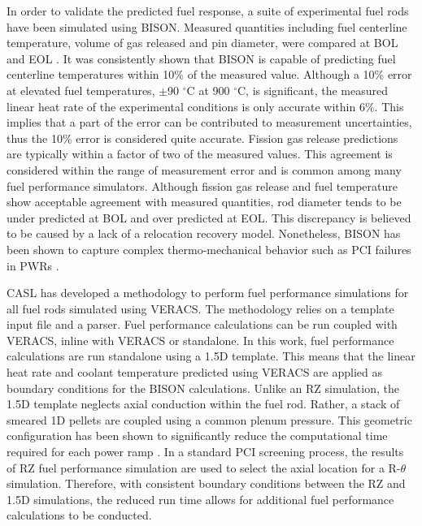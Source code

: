 \documentclass[edeposit,fullpage,11pt]{uiucthesis2009}
\begin{document}
In order to validate the predicted fuel response, a suite of experimental fuel rods have been simulated using BISON.
Measured quantities including fuel centerline temperature, volume of gas released and pin diameter, were compared at \gls{BOL} and \gls{EOL} \cite{williamson_validating_2016}.
It was consistently shown that BISON is capable of predicting fuel centerline temperatures within 10\% of the measured value.
Although a 10\% error at elevated fuel temperatures, $\pm$90 $^\circ$C at 900 $^\circ$C, is significant, the measured linear heat rate of the experimental conditions is only accurate within 6\%. 
This implies that a part of the error can be contributed to measurement uncertainties, thus the 10\% error is considered quite accurate.
Fission gas release predictions are typically within a factor of two of the measured values.
This agreement is considered within the range of measurement error and is common among many fuel performance simulators.
Although fission gas release and fuel temperature show acceptable agreement with measured quantities, rod diameter tends to be under predicted at \gls{BOL} and over predicted at \gls{EOL}.
This discrepancy is believed to be caused by a lack of a relocation recovery model.
Nonetheless, BISON has been shown to capture complex thermo-mechanical behavior such as PCI failures in PWRs \cite{montgomery_advanced_2014,capps_pci_2017}.

\gls{CASL} has developed a methodology to perform fuel performance simulations for all fuel rods simulated using \gls{VERACS}.
The methodology relies on a template input file and a parser.
Fuel performance calculations can be run coupled with \gls{VERACS}, inline with \gls{VERACS} or standalone.
In this work, fuel performance calculations are run standalone using a 1.5D template.
This means that the linear heat rate and coolant temperature predicted using \gls{VERACS} are applied as boundary conditions for the BISON calculations.
Unlike an RZ simulation, the 1.5D template neglects axial conduction within the fuel rod.
Rather, a stack of smeared 1D pellets are coupled using a common plenum pressure.  
This geometric configuration has been shown to significantly reduce the computational time required for each power ramp \cite{gardner_review_2017}.
In a standard \gls{PCI} screening process, the results of RZ fuel performance simulation are used to select the axial location for a R-$\theta$ simulation.
Therefore, with consistent boundary conditions between the RZ and 1.5D simulations, the reduced run time allows for additional fuel performance calculations to be conducted.
\end{document}

